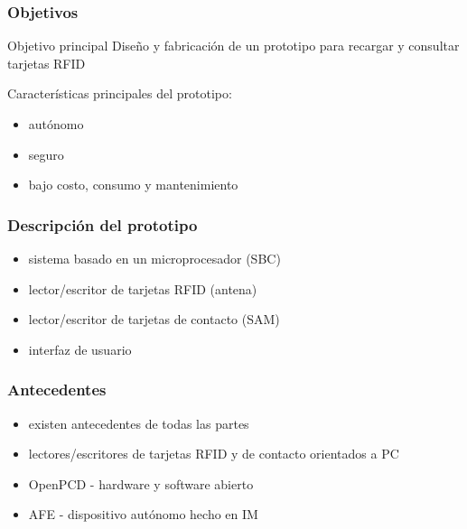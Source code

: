 \documentclass{beamer}
\begin{document}
\begin{frame}
	\frametitle{Objetivos}
		\begin{block}{Objetivo principal}		
			Diseño y fabricación de un prototipo para recargar y consultar tarjetas RFID
		\end{block}

		\bigskip		
		Características principales del prototipo:
		\begin{itemize}			
			\item autónomo

			\bigskip
			\item seguro

			\bigskip
			\item bajo costo, consumo y mantenimiento
	

		\end{itemize}

\end{frame}

\begin{frame}
	\frametitle{Descripción del prototipo}
	\begin{itemize}
		\item sistema basado en un microprocesador (SBC)

		\bigskip
		\item lector/escritor de tarjetas RFID (antena)

		\bigskip
		\item lector/escritor de tarjetas de contacto (SAM)

		\bigskip
		\item interfaz de usuario
	\end{itemize}
\end{frame}

\begin{frame}
	\frametitle{Antecedentes}
	\begin{itemize}
		\item existen antecedentes de todas las partes

		\bigskip
		\item lectores/escritores de tarjetas RFID y de contacto orientados a PC 

		\bigskip
		\item OpenPCD - hardware y software abierto

		\bigskip
		\item AFE - dispositivo autónomo hecho en IM
	\end{itemize}	
\end{frame}
\end{document}
